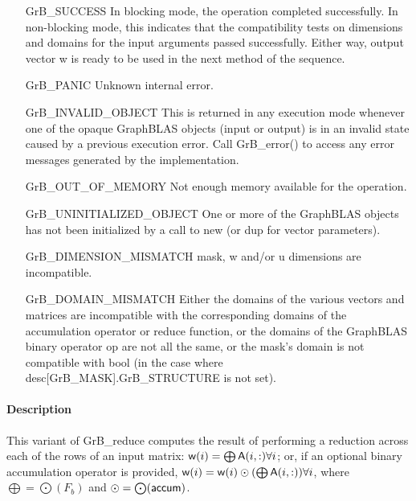 \begin{itemize}[leftmargin=2.1in]
    \item[{\sf GrB\_SUCCESS}]         In blocking mode, the operation completed
    successfully. In non-blocking mode, this indicates that the compatibility 
    tests on dimensions and domains for the input arguments passed successfully. 
    Either way, output vector {\sf w} is ready to be used in the next method of 
    the sequence.

    \item[{\sf GrB\_PANIC}]           Unknown internal error.

    \item[{\sf GrB\_INVALID\_OBJECT}] This is returned in any execution mode 
    whenever one of the opaque GraphBLAS objects (input or output) is in an invalid 
    state caused by a previous execution error.  Call {\sf GrB\_error()} to access 
    any error messages generated by the implementation.

    \item[{\sf GrB\_OUT\_OF\_MEMORY}] Not enough memory available for the operation.

    \item[{\sf GrB\_UNINITIALIZED\_OBJECT}] One or more of the GraphBLAS objects
    has not been initialized by a call to {\sf new} (or {\sf dup} for vector
    parameters).
    
    \item[{\sf GrB\_DIMENSION\_MISMATCH}]  {\sf mask}, {\sf w} and/or {\sf u} dimensions are
    incompatible. 

    \item[{\sf GrB\_DOMAIN\_MISMATCH}]    Either the domains of the various vectors and matrices are
    incompatible with the corresponding domains of the accumulation operator or 
    reduce function, or the domains of the GraphBLAS binary operator {\sf op} are 
    not all the same, or the mask's domain is not compatible with {\sf bool}
    (in the case where {\sf desc[GrB\_MASK].GrB\_STRUCTURE} is not set).
\end{itemize}

\paragraph{Description}

This variant of {\sf GrB\_reduce} computes the result of performing a reduction 
across each of the rows of an input matrix: ${\sf w}(i) = \bigoplus {\sf A}(i,:) \forall i$; 
or, if an optional binary accumulation operator is provided, 
${\sf w}(i) = {\sf w}(i) \odot (\bigoplus {\sf A}(i,:)) \forall i$, 
where $\bigoplus = \bigodot({F_b})$ and $\odot = \bigodot({\sf accum})$.

